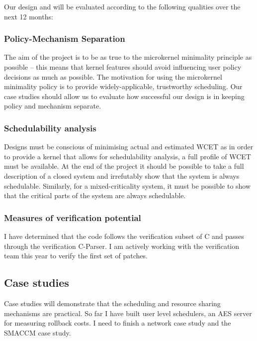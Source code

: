 Our design and will be evaluated according to the following qualities over the next 12 months:

\subsubsection{Policy-Mechanism Separation}

The aim of the project is to be as true to the microkernel minimality principle as possible -- this means that kernel features should avoid influencing user policy decisions as much as possible.
The motivation for using the microkernel minimality policy is to provide widely-applicable, trustworthy scheduling.
Our case studies should allow us to evaluate how successful our design is in keeping policy and mechanism separate.

\subsubsection{Schedulability analysis}

Designs must be conscious of minimising actual and estimated \gls{WCET} as in order to provide a kernel that allows for schedulability analysis, a full profile of \gls{WCET} must be available.
At the end of the project it should be possible to take a full description of a closed system and irrefutably show that the system is always schedulable.
Similarly, for a mixed-criticality system, it must be possible to show that the critical parts of the system are always schedulable.

\subsubsection{Measures of verification potential}

I have determined that the code follows the verification subset of C and passes through the verification C-Parser.
I am actively working with the verification team this year to verify the first set of patches. 

\subsection{Case studies}

Case studies will demonstrate that the scheduling and resource sharing mechanisms are practical.
So far I have built user level schedulers, an AES server for measuring rollback costs. 
I need to finish a network case study and the SMACCM case study. 

